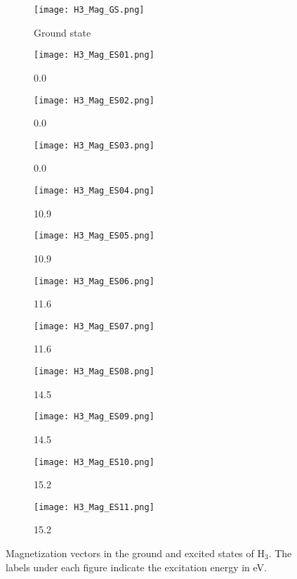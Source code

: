 \documentclass[12pt]{article}
\begin{document}
\begin{figure}
 \begin{subfigure}[b]{.5\linewidth}
  \centering\texttt{[image: H3\_Mag\_GS.png]}
  \caption{Ground state}\label{fg:H3magGS}
 \end{subfigure}
 \begin{subfigure}[b]{.5\linewidth}
  \centering\texttt{[image: H3\_Mag\_ES01.png]}
  \caption{0.0}\label{fg:H3magES01}
 \end{subfigure}
 \begin{subfigure}[b]{.5\linewidth}
  \centering\texttt{[image: H3\_Mag\_ES02.png]}
  \caption{0.0}\label{fg:H3magES02}
 \end{subfigure}
 \begin{subfigure}[b]{.5\linewidth}
  \centering\texttt{[image: H3\_Mag\_ES03.png]}
  \caption{0.0}\label{fg:H3magES03}
 \end{subfigure}
 \begin{subfigure}[b]{.5\linewidth}
  \centering\texttt{[image: H3\_Mag\_ES04.png]}
  \caption{10.9}\label{fg:H3magES04}
 \end{subfigure}
 \begin{subfigure}[b]{.5\linewidth}
  \centering\texttt{[image: H3\_Mag\_ES05.png]}
  \caption{10.9}\label{fg:H3magES05}
 \end{subfigure}
 \begin{subfigure}[b]{.5\linewidth}
  \centering\texttt{[image: H3\_Mag\_ES06.png]}
  \caption{11.6}\label{fg:H3magES06}
 \end{subfigure}
 \begin{subfigure}[b]{.5\linewidth}
  \centering\texttt{[image: H3\_Mag\_ES07.png]}
  \caption{11.6}\label{fg:H3magES07}  
 \end{subfigure}
 \begin{subfigure}[b]{.5\linewidth}
  \centering\texttt{[image: H3\_Mag\_ES08.png]}
  \caption{14.5}\label{fg:H3magES08}
 \end{subfigure}
 \begin{subfigure}[b]{.5\linewidth}
  \centering\texttt{[image: H3\_Mag\_ES09.png]}
  \caption{14.5}\label{fg:H3magES09}
 \end{subfigure}
 \begin{subfigure}[b]{.5\linewidth}
  \centering\texttt{[image: H3\_Mag\_ES10.png]}
  \caption{15.2}\label{fg:H3magES10}
 \end{subfigure}
 \begin{subfigure}[b]{.5\linewidth}
  \centering\texttt{[image: H3\_Mag\_ES11.png]}
  \caption{15.2}\label{fg:H3magES11}  
 \end{subfigure}
 \caption{Magnetization vectors in the ground and excited states of H$_3$. The labels under each figure indicate the excitation energy in eV.}\label{fg:H3mag}
\end{figure}
\end{document}
